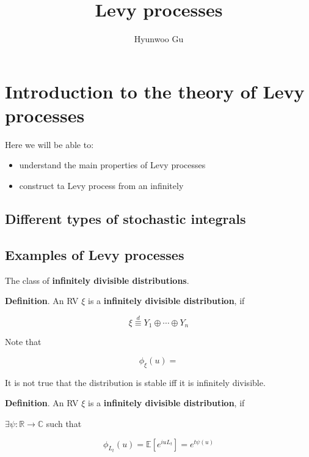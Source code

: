 \documentclass[12pt]{article}
\theoremstyle{nonumberbreak}
\begin{document}
\title{\textbf{Levy processes}}
\author{Hyunwoo Gu}
\date{}

\maketitle


\section{Introduction to the theory of Levy processes}

Here we will be able to: 

\begin{itemize}
	\item understand the main properties of Levy processes
	\item construct ta Levy process from an infinitely 
\end{itemize}


\subsection{Different types of stochastic integrals}

\subsection{Examples of Levy processes}

The class of \textbf{infinitely divisible distributions}. 




\begin{theorem}
\textbf{Definition}. An RV $\xi$ is a \textbf{infinitely divisible distribution}, if 

$$
\xi \overset{d}{\equiv} Y_1 \oplus \cdots \oplus Y_n
$$

Note that 

$$
\phi_\xi(u) = 
$$


\end{theorem}



It is not true that the distribution is stable iff it is infinitely divisible. 



\begin{theorem}
\textbf{Definition}. An RV $\xi$ is a \textbf{infinitely divisible distribution}, if 

$\exists \psi: \mathbb{R} \to \mathbb{C}$ such that

$$
\phi_{L_t} (u) = \mathbb{E} \left[ e^{iuL_t} \right] = e^{t \psi(u)}
$$

\end{theorem}
\end{document}
